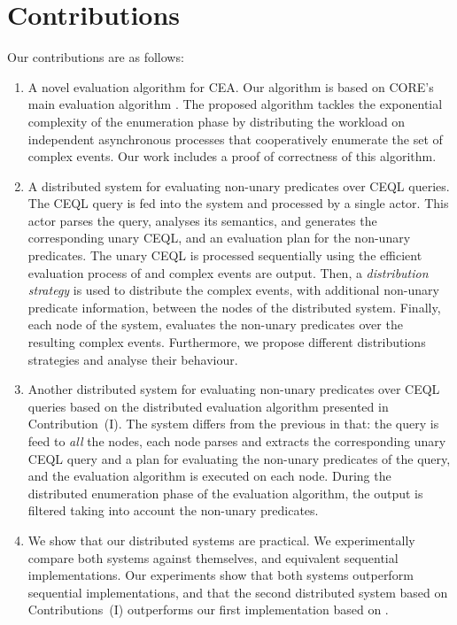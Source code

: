 \section{Contributions}
\label{sec:contribution}

Our contributions are as follows:

\begin{enumerate}[label=(\roman*)]
  \item A novel evaluation algorithm for CEA. Our algorithm is based on CORE's main evaluation algorithm \cite{core}. The proposed algorithm tackles the exponential complexity of the enumeration phase by distributing the workload on independent asynchronous processes that cooperatively enumerate the set of complex events. Our work includes a proof of correctness of this algorithm.

  \item A distributed system for evaluating non-unary predicates over CEQL queries. The CEQL query is fed into the system and processed by a single actor. This actor parses the query, analyses its semantics, and generates the corresponding unary CEQL, and an evaluation plan for the non-unary predicates. The unary CEQL is processed sequentially using the efficient evaluation process of \cite{formal-framework-cep} and complex events are output. Then, a \emph{distribution strategy} is used to distribute the complex events, with additional non-unary predicate information, between the nodes of the distributed system. Finally, each node of the system, evaluates the non-unary predicates over the resulting complex events.   Furthermore, we propose different distributions strategies and analyse their behaviour.

  \item Another distributed system for evaluating non-unary predicates over CEQL queries based on the distributed evaluation algorithm presented in Contribution~(I). The system differs from the previous in that: the query is feed to \emph{all} the nodes, each node parses and extracts the corresponding unary CEQL query and a plan for evaluating the non-unary predicates of the query, and the evaluation algorithm is executed on each node. During the distributed enumeration phase of the evaluation algorithm, the output is filtered taking into account the non-unary predicates.

  \item We show that our distributed systems are practical. We experimentally compare both systems against themselves, and equivalent sequential implementations. Our experiments show that both systems outperform sequential implementations, and that the second distributed system based on Contributions~(I) outperforms our first implementation based on \cite{formal-framework-cep}.
\end{enumerate}

